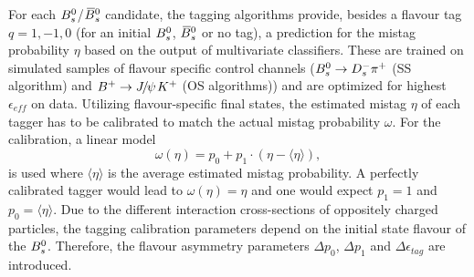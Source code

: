 For each ${{B}^0_{s}}$/${{\kern 0.18em\overline{\kern -0.18em B}{}}{}^0_{s}}$ candidate, the tagging algorithms provide, besides 
a flavour tag $q=1,-1,0$ (for an initial ${{B}^0_{s}}$, ${{\kern 0.18em\overline{\kern -0.18em B}{}}{}^0_{s}}$ or no tag), 
a prediction for the mistag probability $\eta$ 
based on the output of multivariate classifiers.
These are trained on simulated samples of flavour specific control channels (${{B}^0_{s}}\rightarrow{\ensuremath{{D}^-_{s}}}{\ensuremath{{\pi}^+}}$ (SS algorithm) and ${{B}^+}\rightarrow{\ensuremath{{J\mskip -3mu/\mskip -2mu\psi\mskip 2mu}}}{\ensuremath{{K}^+}}$ (OS algorithms))
and are optimized for highest $\epsilon_{eff}$ on data.
Utilizing flavour-specific final states, the estimated mistag $\eta$ of each tagger has to be calibrated to match the actual mistag probability $\omega$. 
For the calibration, a linear model
\begin{equation}
\label{eq: mistagCalibration}
\omega(\eta) = p_{0} + p_{1} \cdot (\eta - \langle \eta \rangle), 
\end{equation}  
is used where $\langle \eta \rangle$ is the average estimated mistag probability.
A perfectly calibrated tagger would lead to $\omega(\eta) = \eta$ and one would expect $p_{1} = 1$ and $p_{0} = \langle \eta \rangle$.
Due to the different interaction cross-sections of oppositely charged particles, the tagging calibration parameters depend on the initial state flavour of the ${{B}^0_{s}}$. 
Therefore, the flavour asymmetry parameters $\Delta p_{0}$, $\Delta p_{1}$ and $\Delta\epsilon_{tag}$ are introduced. 



